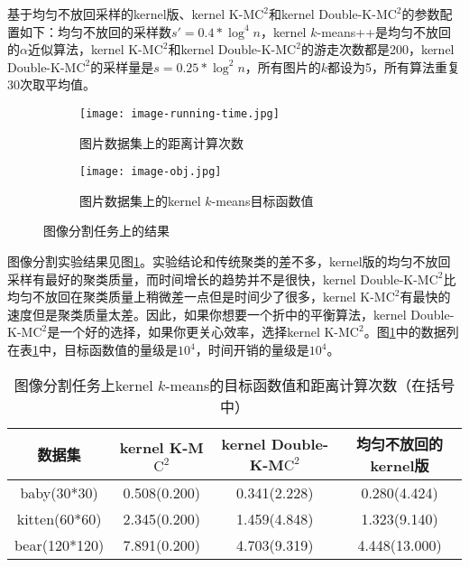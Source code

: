 基于均匀不放回采样的kernel版、kernel K-M$\text{C}^2$和kernel Double-K-M$\text{C}^2$的参数配置如下：均匀不放回的采样数$s' = 0.4*\log^4 n$，kernel $k$-means++是均匀不放回的$\alpha$近似算法，kernel K-M$\text{C}^2$和kernel Double-K-M$\text{C}^2$的游走次数都是200，kernel Double-K-M$\text{C}^2$的采样量是$s = 0.25*\log^2 n$，所有图片的$k$都设为5，所有算法重复30次取平均值。

\begin{figure}[h]
	\begin{subfigure}{.47\linewidth}
		\texttt{[image: image-running-time.jpg]}
		\caption{图片数据集上的距离计算次数}
	\end{subfigure}
	\begin{subfigure}{.47\linewidth}
		\texttt{[image: image-obj.jpg]}
		\caption{图片数据集上的kernel $k$-means目标函数值}
	\end{subfigure}
    \caption{图像分割任务上的结果}
    \label{fig: image running time & ncut}
\end{figure}
图像分割实验结果见图\ref{fig: image running time & ncut}。实验结论和传统聚类的差不多，kernel版的均匀不放回采样有最好的聚类质量，而时间增长的趋势并不是很快，kernel Double-K-M$\text{C}^2$比均匀不放回在聚类质量上稍微差一点但是时间少了很多，kernel K-M$\text{C}^2$有最快的速度但是聚类质量太差。因此，如果你想要一个折中的平衡算法，kernel Double-K-M$\text{C}^2$是一个好的选择，如果你更关心效率，选择kernel K-M$\text{C}^2$。图\ref{fig: image running time & ncut}中的数据列在表\ref{tab:results on image segmentation}中，目标函数值的量级是$10^4$，时间开销的量级是$10^4$。
\begin{table}[h]
	\caption{图像分割任务上kernel $k$-means的目标函数值和距离计算次数（在括号中）}
	\label{tab:results on image segmentation}
	\scriptsize
	\begin{tabular}{cccc}
		\toprule
		数据集 & kernel K-M$\text{C}^2$ & kernel Double-K-M$\text{C}^2$ & 均匀不放回的kernel版 \\
		\midrule
		baby(30*30) & 0.508(0.200) & 0.341(2.228) & 0.280(4.424) \\
		kitten(60*60) & 2.345(0.200) & 1.459(4.848) & 1.323(9.140) \\
		bear(120*120) & 7.891(0.200) & 4.703(9.319) & 4.448(13.000) \\
		\bottomrule
	\end{tabular}
\end{table}
